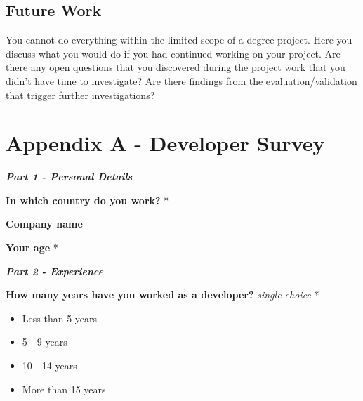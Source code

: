 \documentclass[a4paper,12pt]{article}
\renewcommand{\arraystretch}{1.5}
\begin{document}
\subsection{Future Work}
\noindent You cannot do everything within the limited scope of a degree project. Here you discuss what you would do if you had continued working on your project. Are there any open questions that you discovered during the project work that you didn’t have time to investigate? Are there findings from the evaluation/validation that trigger further investigations?


\newpage
\hypersetup{urlcolor=black}
%
%
\printbibliography[heading=bibintoc]

\newpage
\setcounter{page}{1} %
\appendix

\setlength{\parindent}{0pt}
\setlength{\arrayrulewidth}{0.3mm}
\setlength{\tabcolsep}{4pt}
\renewcommand{\arraystretch}{1.5}

\section{Appendix A - Developer Survey} 
\textbf{\textit{Part 1 - Personal Details}}

\textbf{In which country do you work?} *

\quad

\textbf{Company name}

\quad

\textbf{Your age} *

\quad

\quad

\textbf{\textit{Part 2 - Experience}}

\textbf{How many years have you worked as a developer?} \textit{single-choice} *
\begin{itemize}
    \item Less than 5 years
    \item 5 - 9 years
    \item 10 - 14 years
    \item More than 15 years
\end{itemize}
\end{document}
